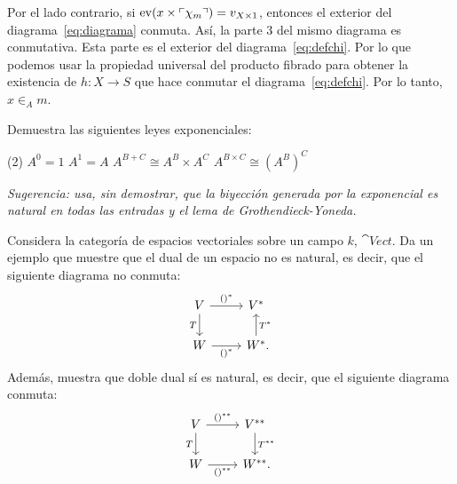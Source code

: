 \begin{solution}[print=true]
  Por el lado contrario, si \(\mathrm{ev}(x\times\ulcorner\chi_m\urcorner)=v_{X\times 1}\),
  entonces el exterior del diagrama~\eqref{eq:diagrama} conmuta. Así, la parte 3
  del mismo diagrama es conmutativa. Esta parte es el exterior del
  diagrama~\eqref{eq:defchi}. Por lo que podemos usar la propiedad universal del
  producto fibrado para obtener la existencia de \(h\colon X\to S\) que hace
  conmutar el diagrama~\eqref{eq:defchi}. Por lo tanto, \(x\in_A m\). 
\end{solution}

\begin{exercise}[par=2]
  Demuestra las siguientes leyes exponenciales:
  \begin{tasks}(2)
    \task \(A^0=1\)
    \task \(A^1=A\)
    \task \(A^{B+C}\cong A^B\times A^C\)
    \task \(A^{B\times C}\cong (A^B)^C\)
  \end{tasks}
  \textit{Sugerencia: usa, sin demostrar, que la biyección generada por la exponencial es natural en todas las entradas y el lema de Grothendieck-Yoneda.}
\end{exercise}

\begin{exercise}[par=2]
  Considera la categoría de espacios vectoriales sobre un campo \(k\),
  \(\cat{Vect}\). Da un ejemplo que muestre que el dual de un espacio no es
  natural, es decir, que el siguiente diagrama no conmuta:
  \begin{equation*}
    \begin{tikzcd}[ampersand replacement=\&]
      V\ar{r}{()^*}\ar{d}[swap]{T} \& V^*\\
      W\ar{r}[swap]{()^*} \& W^*\mathrlap{.}\ar{u}[swap]{T^*}     
    \end{tikzcd}
  \end{equation*}
  Además, muestra que doble dual sí es natural, es decir, que el
  siguiente diagrama conmuta:
  \begin{equation*}
    \begin{tikzcd}[ampersand replacement=\&]
      V\ar{r}{()^{**}}\ar{d}[swap]{T} \& V^{**}\ar{d}{T^{**}}\\
      W\ar{r}[swap]{()^{**}} \& W^{**}\mathrlap{.}
    \end{tikzcd}
  \end{equation*}
\end{exercise}